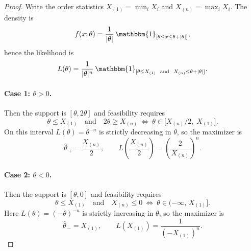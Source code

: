 \documentclass[12pt]{article}
\renewcommand{\(}{\left(}%
\renewcommand{\)}{\right)}%
\renewcommand{\[}{\left[}%
\renewcommand{\]}{\right]}%
\newtheorem{proof}{Proof.}}
\begin{document}
\begin{proof}
Write the order statistics $X_{(1)}=\min_i X_i$ and $X_{(n)}=\max_i X_i$.
The density is
\begin{equation*}
f(x;\theta)=\frac{1}{|\theta|}\,\mathbbm{1}_{[\theta\le x\le \theta+|\theta|]},
\end{equation*}
hence the likelihood is
\begin{equation*}
L(\theta)=\frac{1}{|\theta|^n}\,
\mathbbm{1}_{[\theta\le X_{(1)}\ \text{ and }\ X_{(n)}\le \theta+|\theta|]}.
\end{equation*}

\paragraph{Case 1: $\theta>0$.}
Then the support is $[\theta,2\theta]$ and feasibility requires
\begin{equation*}
\theta\le X_{(1)}\quad\text{and}\quad 2\theta\ge X_{(n)}
\ \Longleftrightarrow\ 
\theta\in\big[X_{(n)}/2,\; X_{(1)}\big].
\end{equation*}
On this interval $L(\theta)=\theta^{-n}$ is strictly decreasing in $\theta$, so the maximizer is
\begin{equation*}
\hat\theta_{\,+}= \frac{X_{(n)}}{2},
\qquad
L\!\left(\frac{X_{(n)}}{2}\right)=\left(\frac{2}{X_{(n)}}\right)^{\!n}.
\end{equation*}

\paragraph{Case 2: $\theta<0$.}
Then the support is $[\theta,0]$ and feasibility requires
\begin{equation*}
\theta\le X_{(1)}\quad\text{and}\quad X_{(n)}\le 0
\ \Longleftrightarrow\ 
\theta\in(-\infty,\,X_{(1)}].
\end{equation*}
Here $L(\theta)=(-\theta)^{-n}$ is strictly increasing in $\theta$, so the maximizer is
\begin{equation*}
\hat\theta_{\,-}= X_{(1)},
\qquad
L\!\left(X_{(1)}\right)=\frac{1}{(-X_{(1)})^n}.
\end{equation*}


\end{proof}
\end{document}
